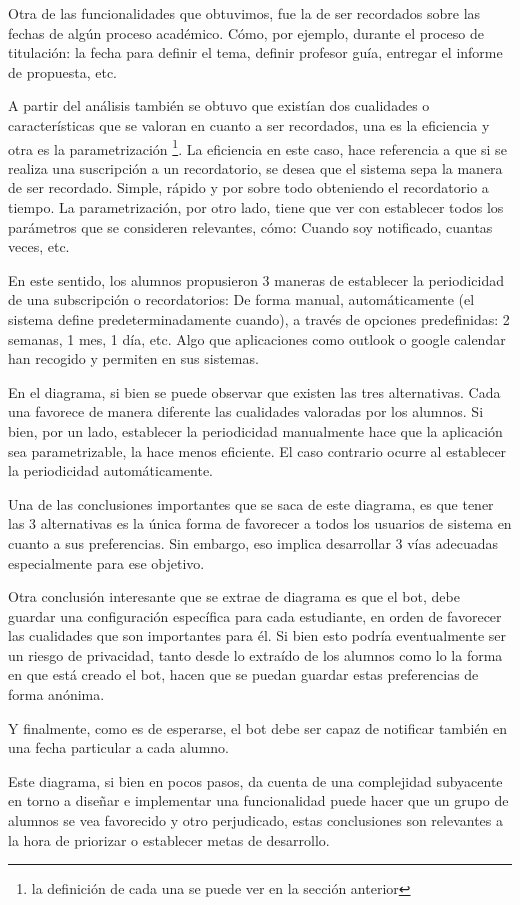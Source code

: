        \par Otra de las funcionalidades que obtuvimos, fue la de ser recordados sobre las fechas de algún proceso académico. Cómo, por ejemplo, durante el proceso de titulación: la fecha para definir el tema, definir profesor guía, entregar el informe de propuesta, etc.
        \par A partir del análisis también se obtuvo que existían dos cualidades o características que se valoran en cuanto a ser recordados, una es la eficiencia y otra es la parametrización \footnote{la definición de cada una se puede ver en la sección anterior}. La eficiencia en este caso, hace referencia a que si se realiza una suscripción a un recordatorio, se desea que el sistema sepa la manera de ser recordado. Simple, rápido y por sobre todo obteniendo el recordatorio a tiempo. La parametrización, por otro lado, tiene que ver con establecer todos los parámetros que se consideren relevantes, cómo: Cuando soy notificado, cuantas veces, etc.
        \par En este sentido, los alumnos propusieron 3 maneras de establecer la periodicidad de una subscripción o recordatorios: De forma manual, automáticamente (el sistema define predeterminadamente cuando), a través de opciones predefinidas: 2 semanas, 1 mes, 1 día, etc. Algo que aplicaciones como outlook o google calendar han recogido y permiten en sus sistemas.
        \par En el diagrama, si bien se puede observar que existen las tres alternativas. Cada una favorece de manera diferente las cualidades valoradas por los alumnos. Si bien, por un lado, establecer la periodicidad manualmente hace que la aplicación sea parametrizable, la hace menos eficiente. El caso contrario ocurre al establecer la periodicidad automáticamente.
        \par Una de las conclusiones importantes que se saca de este diagrama, es que tener las 3 alternativas es la única forma de favorecer a todos los usuarios de sistema en cuanto a sus preferencias. Sin embargo, eso implica desarrollar 3 vías adecuadas especialmente para ese objetivo.
        \par Otra conclusión interesante que se extrae de diagrama es que el bot, debe guardar una configuración específica para cada estudiante, en orden de favorecer las cualidades que son importantes para él. Si bien esto podría eventualmente ser un riesgo de privacidad, tanto desde lo extraído de los alumnos como lo la forma en que está creado el bot, hacen que se puedan guardar estas preferencias de forma anónima.
        \par Y finalmente, como es de esperarse, el bot debe ser capaz de notificar también en una fecha particular a cada alumno.
        \par Este diagrama, si bien en pocos pasos, da cuenta de una complejidad subyacente en torno a diseñar e implementar una funcionalidad puede hacer que un grupo de alumnos se vea favorecido y otro perjudicado, estas conclusiones son relevantes a la hora de priorizar o establecer metas de desarrollo.

